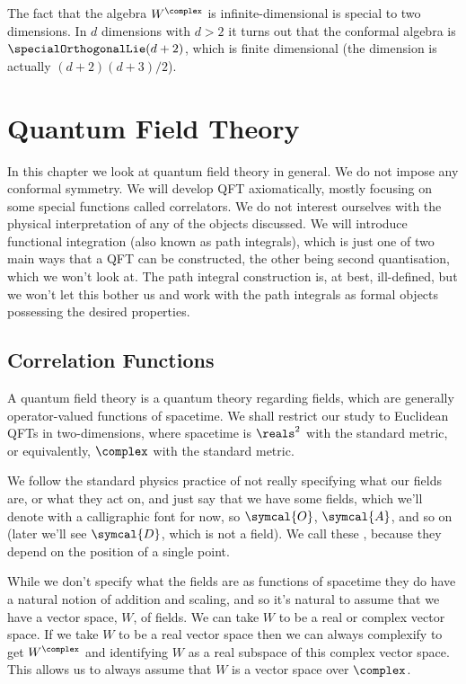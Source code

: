 \documentclass[fleqn]{NotesClass}
\newcommand{\quantumField}[1]{\symcal{#1}}
\newcommand{\DL}{\symcal{D}}
\begin{document}
    The fact that the algebra \(W^{\complex}\) is infinite-dimensional is special to two dimensions.
    In \(d\) dimensions with \(d > 2\) it turns out that the conformal algebra is \(\specialOrthogonalLie(d + 2)\), which is finite dimensional (the dimension is actually \((d + 2)(d + 3)/2\)).
    
    \chapter{Quantum Field Theory}
    In this chapter we look at quantum field theory in general.
    We do not impose any conformal symmetry.
    We will develop QFT axiomatically, mostly focusing on some special functions called correlators.
    We do not interest ourselves with the physical interpretation of any of the objects discussed.
    We will introduce functional integration (also known as path integrals), which is just one of two main ways that a QFT can be constructed, the other being second quantisation, which we won't look at.
    The path integral construction is, at best, ill-defined, but we won't let this bother us and work with the path integrals as formal objects possessing the desired properties.
    
    \section{Correlation Functions}
    A quantum field theory is a quantum theory regarding fields, which are generally operator-valued functions of spacetime.
    We shall restrict our study to Euclidean QFTs in two-dimensions, where spacetime is \(\reals^2\) with the standard metric, or equivalently, \(\complex\) with the standard metric.
    
    We follow the standard physics practice of not really specifying what our fields are, or what they act on, and just say that we have some fields, which we'll denote with a calligraphic font for now, so \(\quantumField{O}\), \(\quantumField{A}\), and so on (later we'll see \(\DL\), which is not a field).
    We call these , because they depend on the position of a single point.
    
    While we don't specify what the fields are as functions of spacetime they do have a natural notion of addition and scaling, and so it's natural to assume that we have a vector space, \(W\), of fields.
    We can take \(W\) to be a real or complex vector space.
    If we take \(W\) to be a real vector space then we can always complexify to get \(W^{\complex}\) and identifying \(W\) as a real subspace of this complex vector space.
    This allows us to always assume that \(W\) is a vector space over \(\complex\).
    
\end{document}
